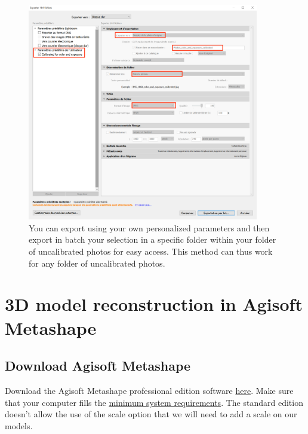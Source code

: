 \documentclass[
]{book}
\begin{document}
\begin{figure}
\hypertarget{export_parameters}{%
\centering
\includegraphics[width=0.9\textwidth,height=\textheight]{Figures/export_capture_1.png}
\caption{You can export using your own personalized parameters and then export
in batch your selection in a specific folder within your folder of
uncalibrated photos for easy access. This method can thus work for any
folder of uncalibrated
photos.}\label{export_parameters}
}
\end{figure}

\hypertarget{d-model-reconstruction-in-agisoft-metashape}{%
\chapter{3D model reconstruction in Agisoft Metashape}\label{d-model-reconstruction-in-agisoft-metashape}}

\hypertarget{download-agisoft-metashape}{%
\section{Download Agisoft Metashape}\label{download-agisoft-metashape}}

Download the Agisoft Metashape professional edition software
\href{https://www.agisoft.com/downloads/installer/}{here}. Make sure that
your computer fills the \href{https://www.agisoft.com/downloads/system-requirements/}{minimum system
requirements}.
The standard edition doesn't allow the use of the scale option that we
will need to add a scale on our models.
\end{document}
